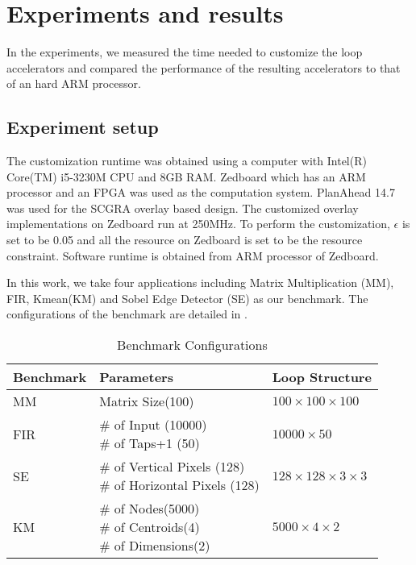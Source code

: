 \section{Experiments and results} \label{sec:result}
In the experiments, we measured the time needed to customize the loop accelerators and compared the
performance of the resulting accelerators to that of an hard ARM processor. 

\subsection{Experiment setup}
The customization runtime was obtained using a computer with Intel(R) Core(TM) 
i5-3230M CPU and 8GB RAM. Zedboard which has an ARM processor and 
an FPGA was used as the computation system. PlanAhead 14.7 was used for the SCGRA overlay based 
design. The customized overlay implementations on Zedboard run at 250MHz. To perform the
customization, $\epsilon$ is set to be 0.05 and all the resource on Zedboard is set to be the
resource constraint. Software runtime is obtained from ARM processor of Zedboard.  

In this work, we take four applications including Matrix Multiplication (MM), 
FIR, Kmean(KM) and Sobel Edge Detector (SE) as our benchmark. The 
configurations of the benchmark are detailed in . 

\begin{table}[tb]
    \scriptsize
    \centering
    \caption{Benchmark Configurations \label{tab:benchmark-config}}{
        \begin{tabular}{l|l|l}
            \hline
            Benchmark & Parameters & Loop Structure \\ \hline
            MM & Matrix Size(100) & $100 \times 100 \times 100$ \\ \hline
            FIR & \tabincell{l}{\# of Input (10000) \\ \# of Taps+1 (50)} & $10000 \times 50$ \\ \hline
            SE & \tabincell{l}{ \# of Vertical Pixels (128) \\ \# of Horizontal Pixels (128)} & $128
            \times 128 \times 3 \times 3$ \\ \hline 
            KM & \tabincell{l}{\# of Nodes(5000) \\ \# of Centroids(4) \\ \# of Dimensions(2)} &
            $5000 \times 4 \times 2$ \\ \hline  
        \end{tabular}
    }
\end{table}


